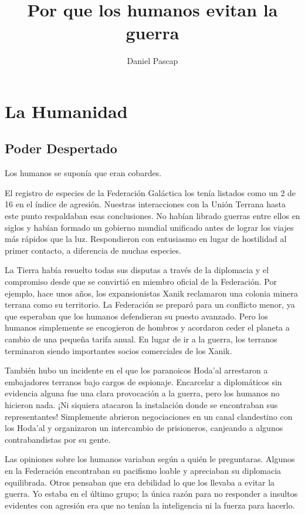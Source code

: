 \documentclass[spanish,12pt,a4paper,oneside,titlepage]{book}
\title{Por que los humanos evitan la guerra}
\author{Daniel Pascap}
\begin{document}
    \maketitle
    \tableofcontents

    \part{La Humanidad}
    \chapter{Poder Despertado}

    Los humanos se suponía que eran cobardes.

    El registro de especies de la Federación Galáctica los tenía listados como un 2 de 16 en el índice de agresión. Nuestras interacciones con la Unión Terrana hasta este punto respaldaban esas conclusiones. No habían librado guerras entre ellos en siglos y habían formado un gobierno mundial unificado antes de lograr los viajes más rápidos que la luz. Respondieron con entusiasmo en lugar de hostilidad al primer contacto, a diferencia de muchas especies.

    La Tierra había resuelto todas sus disputas a través de la diplomacia y el compromiso desde que se convirtió en miembro oficial de la Federación. Por ejemplo, hace unos años, los expansionistas Xanik reclamaron una colonia minera terrana como su territorio. La Federación se preparó para un conflicto menor, ya que esperaban que los humanos defendieran su puesto avanzado. Pero los humanos simplemente se encogieron de hombros y acordaron ceder el planeta a cambio de una pequeña tarifa anual. En lugar de ir a la guerra, los terranos terminaron siendo importantes socios comerciales de los Xanik.

    También hubo un incidente en el que los paranoicos Hoda'al arrestaron a embajadores terranos bajo cargos de espionaje. Encarcelar a diplomáticos sin evidencia alguna fue una clara provocación a la guerra, pero los humanos no hicieron nada. ¡Ni siquiera atacaron la instalación donde se encontraban sus representantes! Simplemente abrieron negociaciones en un canal clandestino con los Hoda'al y organizaron un intercambio de prisioneros, canjeando a algunos contrabandistas por su gente.

    Las opiniones sobre los humanos variaban según a quién le preguntaras. Algunos en la Federación encontraban su pacifismo loable y apreciaban su diplomacia equilibrada. Otros pensaban que era debilidad lo que los llevaba a evitar la guerra. Yo estaba en el último grupo; la única razón para no responder a insultos evidentes con agresión era que no tenían la inteligencia ni la fuerza para hacerlo.
\end{document}
